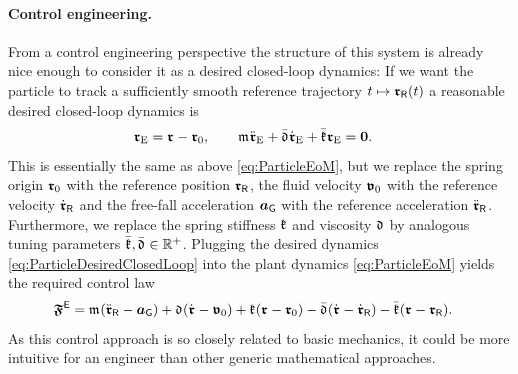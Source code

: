 \paragraph{Control engineering.}
From a control engineering perspective the structure of this system is already nice enough to consider it as a desired closed-loop dynamics:
If we want the particle to track a sufficiently smooth reference trajectory $t\mapsto\boldsymbol{\mathfrak{r}}_{\mathsf{R}}(t)$ a reasonable desired closed-loop dynamics is
\begin{align}\label{eq:ParticleDesiredClosedLoop}
 \boldsymbol{\mathfrak{r}}_{\mathrm{E}} = \boldsymbol{\mathfrak{r}}_{} - \boldsymbol{\mathfrak{r}}_{0},
\qquad
 \mathfrak{m}_{} \ddot{\boldsymbol{\mathfrak{r}}}_{\mathrm{E}} + \bar{\mathfrak{d}}_{} \dot{\boldsymbol{\mathfrak{r}}}_{\mathrm{E}} + \bar{\mathfrak{k}}_{} \boldsymbol{\mathfrak{r}}_{\mathrm{E}} &= \boldsymbol{0}.
\end{align}
This is essentially the same as above \eqref{eq:ParticleEoM}, but we replace the spring origin $\boldsymbol{\mathfrak{r}}_{0}$ with the reference position $\boldsymbol{\mathfrak{r}}_{\mathsf{R}}$, the fluid velocity $\boldsymbol{\mathfrak{v}}_0$ with the reference velocity $\dot{\boldsymbol{\mathfrak{r}}}_{\mathsf{R}}$ and the free-fall acceleration $\boldsymbol{a}_{\mathsf{G}}$ with the reference acceleration $\ddot{\boldsymbol{\mathfrak{r}}}_{\mathsf{R}}$.
Furthermore, we replace the spring stiffness $\mathfrak{k}_{}$ and viscosity $\mathfrak{d}_{}$ by analogous tuning parameters $\bar{\mathfrak{k}}_{}, \bar{\mathfrak{d}}_{} \in \mathbb{R}^+$.
Plugging the desired dynamics \eqref{eq:ParticleDesiredClosedLoop} into the plant dynamics \eqref{eq:ParticleEoM} yields the required control law
\begin{align}
 \boldsymbol{\mathfrak{F}}_{}^{\mathsf{E}} &= \mathfrak{m}_{} (\ddot{\boldsymbol{\mathfrak{r}}}_{\mathsf{R}} - \boldsymbol{a}_{\mathsf{G}}) + \mathfrak{d}_{} (\dot{\boldsymbol{\mathfrak{r}}}_{} - \boldsymbol{\mathfrak{v}}_0) + \mathfrak{k}_{} (\boldsymbol{\mathfrak{r}}_{} - \boldsymbol{\mathfrak{r}}_{0}) - \bar{\mathfrak{d}}_{} (\dot{\boldsymbol{\mathfrak{r}}}_{} - \dot{\boldsymbol{\mathfrak{r}}}_{\mathsf{R}}) - \bar{\mathfrak{k}}_{} (\boldsymbol{\mathfrak{r}}_{} - \boldsymbol{\mathfrak{r}}_{\mathsf{R}}).
\end{align}
As this control approach is so closely related to basic mechanics, it could be more intuitive for an engineer than other generic mathematical approaches.

